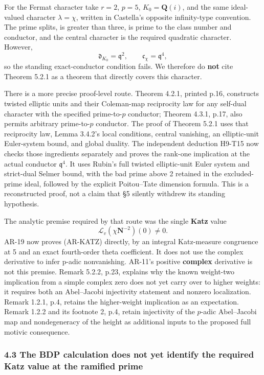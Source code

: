 \documentclass[11pt,a4paper]{article}
\begin{document}
For the Fermat character take \(r=2\), \(p=5\), \(K_0=\mathbf Q(i)\),
and the same ideal-valued character \(\lambda=\chi\), written in
Castella's opposite infinity-type convention. The prime splits, is
greater than three, is prime to the class number and conductor, and the
central character is the required quadratic character. However, \[
\mathfrak d_{K_0}=\mathfrak q^2,\qquad
\mathfrak c_\chi=\mathfrak q^4,
\] so the standing exact-conductor condition fails. We therefore do
\textbf{not} cite Theorem 5.2.1 as a theorem that directly covers this
character.

There is a more precise proof-level route. Theorem 4.2.1, printed p.16,
constructs twisted elliptic units and their Coleman-map reciprocity law
for any self-dual character with the specified prime-to-\(p\) conductor;
Theorem 4.3.1, p.17, also permits arbitrary prime-to-\(p\) conductor.
The proof of Theorem 5.2.1 uses that reciprocity law, Lemma 3.4.2's
local conditions, central vanishing, an elliptic-unit Euler-system
bound, and global duality. The independent deduction H9-T15 now checks
those ingredients separately and proves the rank-one implication at the
actual conductor \(\mathfrak q^4\). It uses Rubin's full twisted
elliptic-unit Euler system and strict-dual Selmer bound, with the bad
prime above 2 retained in the excluded-prime ideal, followed by the
explicit Poitou--Tate dimension formula. This is a reconstructed proof,
not a claim that §5 silently withdrew its standing hypothesis.

The analytic premise required by that route was the single \textbf{Katz}
value \[
\mathcal L_v(\chi\mathbf N^{-2})(0)\ne0.
\tag{AR-KATZ}
\] AR-19 now proves (AR-KATZ) directly, by an integral Katz-measure
congruence at 5 and an exact fourth-order theta coefficient. It does not
use the complex derivative to infer p-adic nonvanishing. AR-11's
positive \textbf{complex} derivative is not this premise. Remark 5.2.2,
p.23, explains why the known weight-two implication from a simple
complex zero does not yet carry over to higher weights: it requires both
an Abel--Jacobi injectivity statement and nonzero localization. Remark
1.2.1, p.4, retains the higher-weight implication as an expectation.
Remark 1.2.2 and its footnote 2, p.4, retain injectivity of the
\(p\)-adic Abel--Jacobi map and nondegeneracy of the height as
additional inputs to the proposed full motivic consequence.

\subsubsection{4.3 The BDP calculation does not yet identify the
required Katz value at the ramified
prime}\label{the-bdp-calculation-does-not-yet-identify-the-required-katz-value-at-the-ramified-prime}
\end{document}
